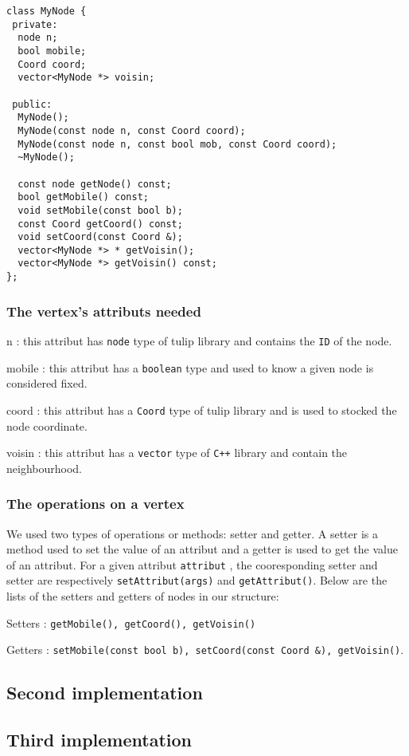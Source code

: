 \newpage
\begin{lstlisting}
class MyNode {
 private:
  node n;
  bool mobile;
  Coord coord;  
  vector<MyNode *> voisin;

 public:
  MyNode();
  MyNode(const node n, const Coord coord);
  MyNode(const node n, const bool mob, const Coord coord);
  ~MyNode();
  
  const node getNode() const;
  bool getMobile() const;
  void setMobile(const bool b);
  const Coord getCoord() const;
  void setCoord(const Coord &);
  vector<MyNode *> * getVoisin();
  vector<MyNode *> getVoisin() const;
};
\end{lstlisting}

\subsubsection{The vertex's attributs needed}
\begin{dinglist}{70}
\item[n]: this attribut has \texttt{node} type of \textsf{tulip} library and contains the \texttt{ID} of the node.  
\item[mobile]: this attribut has a \texttt{boolean} type and used to know a given node is considered fixed.
\item[coord]: this attribut has a \texttt{Coord} type of \textsf{tulip} library and is used to stocked the node coordinate. 
\item[voisin]: this attribut has a \texttt{vector} type of \texttt{C++} library and contain the neighbourhood.
\end{dinglist}

\subsubsection{The operations on a vertex}
We used two types of operations or methods: \textsf{setter} and
\textsf{getter}. A \textsf{setter} is a method used to set the value
of an attribut and a \textsf{getter} is used to get the value of an
attribut. For a given attribut \texttt{attribut} , the cooresponding
setter and setter are respectively \verb+setAttribut(args)+ and \verb+getAttribut()+. Below are the lists of the setters and getters of nodes in our structure:
\begin{dinglist}{70}
\item[Setters]: \verb+getMobile(), getCoord(), getVoisin()+  
\item[Getters]: \verb+setMobile(const bool b), setCoord(const Coord &), getVoisin()+.
\end{dinglist}

\subsection{Second implementation}
\subsection{Third implementation}
\newpage
